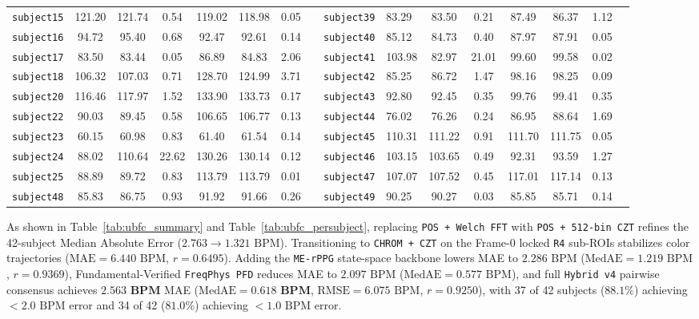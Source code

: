 \documentclass[conference]{IEEEtran}
\begin{document}
\begin{table}[t]
{\begin{tabular}{@{}lcccccccclcccccc@{}}
\texttt{subject15} & 121.20 & 121.74 & 0.54 & 119.02 & 118.98 & 0.05 & & \texttt{subject39} & 83.29  & 83.50  & 0.21 & 87.49  & 86.37  & 1.12 \\
\texttt{subject16} & 94.72  & 95.40  & 0.68 & 92.47  & 92.61  & 0.14 & & \texttt{subject40} & 85.12  & 84.73  & 0.40 & 87.97  & 87.91  & 0.05 \\
\texttt{subject17} & 83.50  & 83.44  & 0.05 & 86.89  & 84.83  & 2.06 & & \texttt{subject41} & 103.98 & 82.97  & 21.01& 99.60  & 99.58  & 0.02 \\
\texttt{subject18} & 106.32 & 107.03 & 0.71 & 128.70 & 124.99 & 3.71 & & \texttt{subject42} & 85.25  & 86.72  & 1.47 & 98.16  & 98.25  & 0.09 \\
\texttt{subject20} & 116.46 & 117.97 & 1.52 & 133.90 & 133.73 & 0.17 & & \texttt{subject43} & 92.80  & 92.45  & 0.35 & 99.76  & 99.41  & 0.35 \\
\texttt{subject22} & 90.03  & 89.45  & 0.58 & 106.65 & 106.77 & 0.13 & & \texttt{subject44} & 76.02  & 76.26  & 0.24 & 86.95  & 88.64  & 1.69 \\
\texttt{subject23} & 60.15  & 60.98  & 0.83 & 61.40  & 61.54  & 0.14 & & \texttt{subject45} & 110.31 & 111.22 & 0.91 & 111.70 & 111.75 & 0.05 \\
\texttt{subject24} & 88.02  & 110.64 & 22.62 & 130.26 & 130.14 & 0.12 & & \texttt{subject46} & 103.15 & 103.65 & 0.49 & 92.31  & 93.59  & 1.27 \\
\texttt{subject25} & 88.89  & 89.72  & 0.83 & 113.79 & 113.79 & 0.01 & & \texttt{subject47} & 107.07 & 107.52 & 0.45 & 117.01 & 117.14 & 0.13 \\
\texttt{subject48} & 85.83  & 86.75  & 0.93 & 91.92  & 91.66  & 0.26 & & \texttt{subject49} & 90.25  & 90.27  & 0.03 & 85.85  & 85.71  & 0.14 \\
\bottomrule
\end{tabular}%
}
\end{table}

As shown in Table~\ref{tab:ubfc_summary} and Table~\ref{tab:ubfc_persubject}, replacing \texttt{POS + Welch FFT} with \texttt{POS + 512-bin CZT} refines the 42-subject Median Absolute Error ($2.763 \to 1.321\text{ BPM}$). Transitioning to \texttt{CHROM + CZT} on the Frame-0 locked \texttt{R4} sub-ROIs stabilizes color trajectories ($\text{MAE} = 6.440\text{ BPM}$, $r = 0.6495$). Adding the \texttt{ME-rPPG} state-space backbone lowers MAE to $2.286\text{ BPM}$ ($\text{MedAE} = 1.219\text{ BPM}$, $r = 0.9369$), Fundamental-Verified \texttt{FreqPhys PFD} reduces MAE to $2.097\text{ BPM}$ ($\text{MedAE} = 0.577\text{ BPM}$), and full \texttt{Hybrid v4} pairwise consensus achieves $\mathbf{2.563\text{ BPM}}$ MAE ($\text{MedAE} = \mathbf{0.618\text{ BPM}}$, $\text{RMSE} = 6.075\text{ BPM}$, $r = \mathbf{0.9250}$), with 37 of 42 subjects ($88.1\%$) achieving $<2.0\text{ BPM}$ error and 34 of 42 ($81.0\%$) achieving $<1.0\text{ BPM}$ error.
\end{document}
